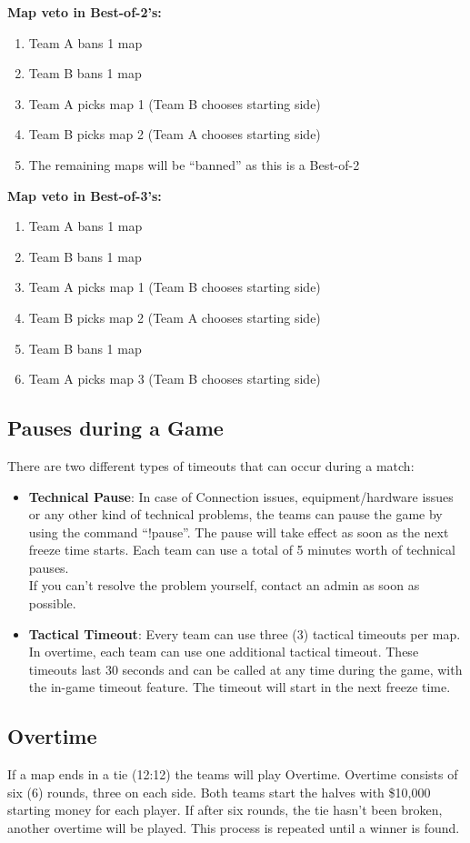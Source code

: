 \documentclass{article}
\newcommand{\TeamA}{{\color{red}Team A }}
\newcommand{\TeamB}{{\color{blue}Team B }}
\begin{document}
\textbf{Map veto in Best-of-2's:}
\begin{enumerate}
    \item \TeamA bans 1 map
    \item \TeamB bans 1 map
    \item \TeamA picks map 1 (\TeamB chooses starting side)
    \item \TeamB picks map 2 (\TeamA chooses starting side)
    \item The remaining maps will be “banned” as this is a Best-of-2
\end{enumerate}

\textbf{Map veto in Best-of-3's:}
\begin{enumerate}
    \item \TeamA bans 1 map
    \item \TeamB bans 1 map
    \item \TeamA picks map 1 (\TeamB chooses starting side)
    \item \TeamB picks map 2 (\TeamA chooses starting side)
    \item \TeamB bans 1 map
    \item \TeamA picks map 3 (\TeamB chooses starting side)
\end{enumerate}

\subsection{Pauses during a Game}\label{pauses}
There are two different types of timeouts that can occur during a match:
\begin{itemize}
    \item \textbf{Technical Pause}: In case of Connection issues, equipment/hardware issues or any other kind of technical problems, the teams can pause the game by using the command “!pause”. The pause will take effect as soon as the next freeze time starts. Each team can use a total of 5 minutes worth of technical pauses.\\
    If you can't resolve the problem yourself, contact an admin as soon as possible.
    \item \textbf{Tactical Timeout}: Every team can use three (3) tactical timeouts per map. In overtime, each team can use one additional tactical timeout. These timeouts last 30 seconds and can be called at any time during the game, with the in-game timeout feature. The timeout will start in the next freeze time.

\end{itemize}

\subsection{Overtime}\label{overtime}
If a map ends in a tie (12:12) the teams will play Overtime. Overtime consists of six (6) rounds, three on each side. Both teams
start the halves with \$10,000 starting money for each player. If after six rounds, the tie hasn't been broken, another overtime will be played. This process is repeated until a winner is found. 
\end{document}
